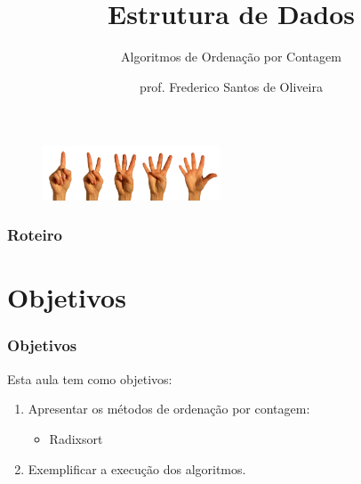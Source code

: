 \documentclass[aspectratio=169]{beamer}
\title[Algoritmos de Ordenação por Contagem]{Estrutura de Dados}
\subtitle{Algoritmos de Ordenação por Contagem}
\author[Frederico Santos de Oliveira]{prof. Frederico Santos de Oliveira}
\institute[UFMT]{Universidade Federal de Mato Grosso\\ Instituto de Engenharia}
\date{}
\begin{document}
\begin{frame}
\titlepage %

\begin{figure}[!h]
  \centering
  \includegraphics[width=150pt]{imgs/introducao.jpg}
  \label{fig_introducao}
\end{figure}
\end{frame}


\begin{frame}
\frametitle{Roteiro} %
\tableofcontents %
\end{frame}


\section{Objetivos}

\begin{frame}
\frametitle{Objetivos}

Esta aula tem como objetivos:

\begin{enumerate}
\item Apresentar os métodos de ordenação por contagem:
\begin{itemize}
 \item Radixsort
 \end{itemize}
\item Exemplificar a execução dos algoritmos.
\end{enumerate}
\end{frame}
\end{document}

